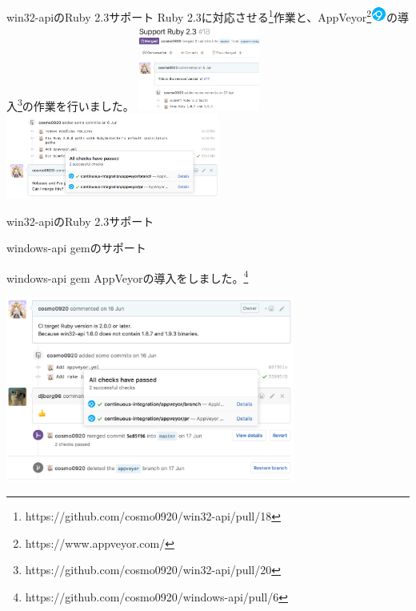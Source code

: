 \documentclass[12pt, unicode]{beamer}
\begin{document}
\begin{frame}{win32-apiのRuby 2.3サポート}
  Ruby 2.3に対応させる\footnote[frame]{https://github.com/cosmo0920/win32-api/pull/18}作業と、AppVeyor\footnote[frame]{https://www.appveyor.com/}\includegraphics[clip,width=0.5cm]{images/appveyor_logo.png}の導入\footnote[frame]{https://github.com/cosmo0920/win32-api/pull/20}の作業を行いました。
  \includegraphics[clip,width=4cm]{images/support_ruby23_win32-api.png}
  \includegraphics[clip,width=7cm]{images/support_appveyor_win32-api.png}
\end{frame}

\begin{frame}{win32-apiのRuby 2.3サポート}
  \Large {
  }
\end{frame}

\begin{frame}{windows-api gemのサポート}
  \begin{block}{windows-api gem}
    AppVeyorの導入をしました。\footnote[frame]{https://github.com/cosmo0920/windows-api/pull/6}
  \end{block}
  \includegraphics[clip,width=9.5cm]{images/support_appveyor_windows-api_gem.png}
\end{frame}
\end{document}

